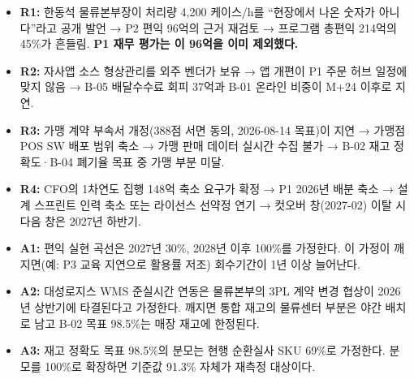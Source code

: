 \documentclass[10pt,a4paper]{article}
\begin{document}
\begin{fieldbox}
\par
{}
\end{fieldbox}

\begin{fieldbox}
\ifwbblank
{} 
 
 
 
 
 
 
\else
\begin{itemize}
\item \textbf{R1:} 한동석 물류본부장이 처리량 4,200 케이스/h를 “현장에서 나온 숫자가 아니다”라고 공개 발언 → P2 편익 96억의 근거 재검토 → 프로그램 총편익 214억의 45\%가 흔들림. \textbf{P1 재무 평가는 이 96억을 이미 제외했다.}
\item \textbf{R2:} 자사앱 소스 형상관리를 외주 벤더가 보유 → 앱 개편이 P1 주문 허브 일정에 맞지 않음 → B-05 배달수수료 회피 37억과 B-01 온라인 비중이 M+24 이후로 지연.
\item \textbf{R3:} 가맹 계약 부속서 개정(388점 서면 동의, 2026-08-14 목표)이 지연 → 가맹점 POS SW 배포 범위 축소 → 가맹 판매 데이터 실시간 수집 불가 → B-02 재고 정확도·B-04 폐기율 목표 중 가맹 부분 미달.
\item \textbf{R4:} CFO의 1차연도 집행 148억 축소 요구가 확정 → P1 2026년 배분 축소 → 설계 스프린트 인력 축소 또는 라이선스 선약정 연기 → 컷오버 창(2027-02) 이탈 시 다음 창은 2027년 하반기.
\item \textbf{A1:} 편익 실현 곡선은 2027년 30\%, 2028년 이후 100\%를 가정한다. 이 가정이 깨지면(예: P3 교육 지연으로 활용률 저조) 회수기간이 1년 이상 늘어난다.
\item \textbf{A2:} 대성로지스 WMS 준실시간 연동은 물류본부의 3PL 계약 변경 협상이 2026년 상반기에 타결된다고 가정한다. 깨지면 통합 재고의 물류센터 부분은 야간 배치로 남고 B-02 목표 98.5\%는 매장 재고에 한정된다.
\item \textbf{A3:} 재고 정확도 목표 98.5\%의 분모는 현행 순환실사 SKU 69\%로 가정한다. 분모를 100\%로 확장하면 기준값 91.3\% 자체가 재측정 대상이다.
\end{itemize}
\fi
\end{fieldbox}
\end{document}
